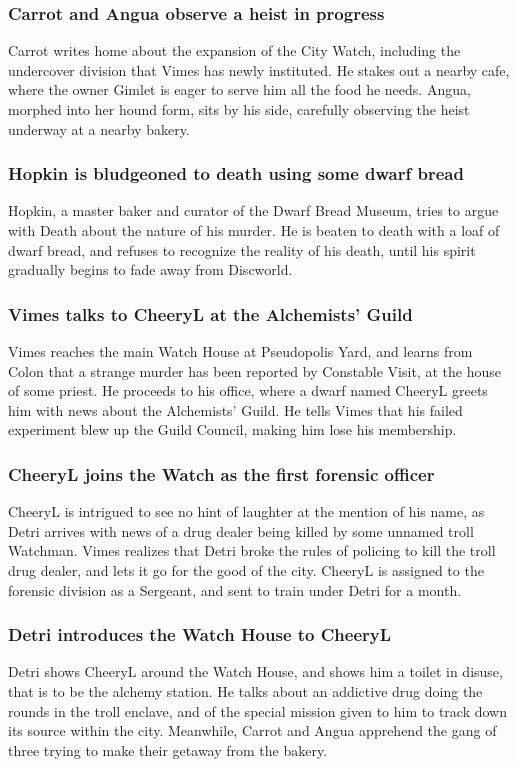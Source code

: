 \subsubsection{\Gls{Carrot} and \Gls{Angua} observe a heist in progress}
\Gls{Carrot} writes home about the expansion of the City Watch, including the undercover division
that \Gls{Vimes} has newly instituted. He stakes out a nearby cafe, where the owner \Gls{Gimlet}
is eager to serve him all the food he needs. \Gls{Angua}, morphed into her hound form, sits by his
side, carefully observing the heist underway at a nearby bakery.

\subsubsection{\Gls{Hopkin} is bludgeoned to death using some dwarf bread}
\Gls{Hopkin}, a master baker and curator of the Dwarf Bread Museum, tries to argue with \Gls{Death}
about the nature of his murder. He is beaten to death with a loaf of dwarf bread, and refuses to
recognize the reality of his death, until his spirit gradually begins to fade away from Discworld.

\subsubsection{\Gls{Vimes} talks to \Gls{CheeryL} at the Alchemists' Guild}
\Gls{Vimes} reaches the main Watch House at Pseudopolis Yard, and learns from \Gls{Colon} that a
strange murder has been reported by Constable \Gls{Visit}, at the house of some priest. He proceeds
to his office, where a dwarf named \Gls{CheeryL} greets him with news about the Alchemists' Guild.
He tells \Gls{Vimes} that his failed experiment blew up the Guild Council, making him lose his
membership.

\subsubsection{\Gls{CheeryL} joins the Watch as the first forensic officer}
\Gls{CheeryL} is intrigued to see no hint of laughter at the mention of his name, as \Gls{Detri}
arrives with news of a drug dealer being killed by some unnamed troll Watchman. \Gls{Vimes}
realizes that \Gls{Detri} broke the rules of policing to kill the troll drug dealer, and lets it
go for the good of the city. \Gls{CheeryL} is assigned to the forensic division as a Sergeant, and
sent to train under \Gls{Detri} for a month.

\subsubsection{\Gls{Detri} introduces the Watch House to \Gls{CheeryL}}
\Gls{Detri} shows \Gls{CheeryL} around the Watch House, and shows him a toilet in disuse, that is
to be the alchemy station. He talks about an addictive drug doing the rounds in the troll enclave,
and of the special mission given to him to track down its source within the city. Meanwhile,
\Gls{Carrot} and \Gls{Angua} apprehend the gang of three trying to make their getaway from the
bakery.

